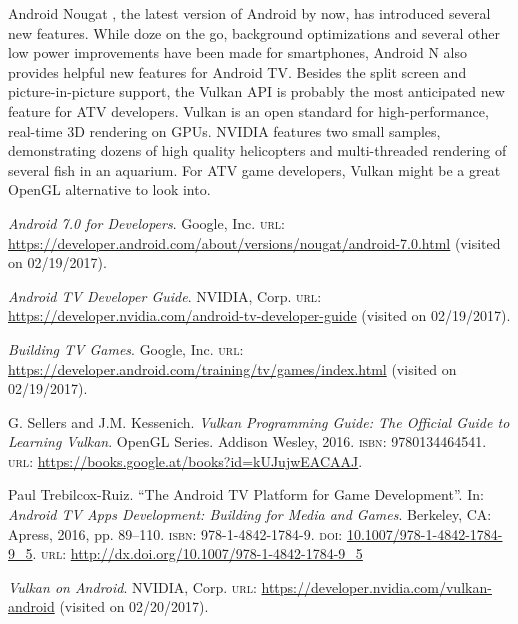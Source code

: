 \documentclass[a4paper]{article}
\begin{document}
Android Nougat \cite{Android-Developer:Nougat}, the latest version of Android by now, has introduced several new features. While doze on the go, background optimizations and several other low power improvements have been made for smartphones, Android N also provides helpful new features for Android TV. Besides the split screen and picture-in-picture support, the Vulkan \cite{sellers2016vulkan} API is probably the most anticipated new feature for ATV developers. Vulkan is an open standard for high-performance, real-time 3D rendering on GPUs. NVIDIA \cite{NVIDIA-Developer:Vulkan} features two small samples, demonstrating dozens of high quality helicopters and multi-threaded rendering of several fish in an aquarium. For ATV game developers, Vulkan might be a great OpenGL alternative to look into.

\renewcommand{\refname}{\section{References and Further Sources}}
\begin{thebibliography}{6}
\emph{Android 7.0 for Developers}. Google, Inc. \textsc{url}: \url{https://developer.android.com/about/versions/nougat/android-7.0.html} (visited on 02/19/2017).

\emph{Android TV Developer Guide}. NVIDIA, Corp. \textsc{url}: \url{https://developer.nvidia.com/android-tv-developer-guide} (visited on 02/19/2017).

\emph{Building TV Games}. Google, Inc. \textsc{url}: \url{https://developer.android.com/training/tv/games/index.html} (visited on 02/19/2017).

G. Sellers and J.M. Kessenich. \emph{Vulkan Programming Guide: The Official Guide to Learning Vulkan}. OpenGL Series. Addison Wesley, 2016. \textsc{isbn}: 9780134464541. \textsc{url}: \url{https://books.google.at/books?id=kUJujwEACAAJ}.

Paul Trebilcox-Ruiz. “The Android TV Platform for Game Development”. In: \emph{Android TV Apps Development: Building for Media and Games}. Berkeley, CA: Apress, 2016, pp. 89–110. \textsc{isbn}: 978-1-4842-1784-9. \textsc{doi}: \href{http://dx.doi.org/10.1007/978-1-4842-1784-9\_5}{10.1007/978-1-4842-1784-9\_5}. \textsc{url}: \url{http://dx.doi.org/10.1007/978-1-4842-1784-9\_5}

\emph{Vulkan on Android}. NVIDIA, Corp. \textsc{url}: \url{https://developer.nvidia.com/vulkan-android} (visited on 02/20/2017).
\end{thebibliography}
\end{document}
